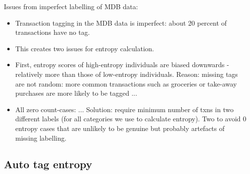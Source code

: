Issues from imperfect labelling of MDB data:
\begin{itemize}

    \item Transaction tagging in the MDB data is imperfect: about 20 percent of
        transactions have no tag.

    \item This creates two issues for entropy calculation.

    \item First, entropy scores of high-entropy individuals are biased
        downwards - relatively more than those of low-entropy individuals.
        Reason: missing tags are not random: more common transactions such as
        groceries or take-away purchases are more likely to be tagged ...

    \item All zero count-cases: ... Solution: require minimum number of txns in
        two different labels (for all categories we use to calculate entropy).
        Two to avoid 0 entropy cases that are unlikely to be genuine but
        probably artefacts of missing labelling.
        
\end{itemize}



\subsection{Auto tag entropy}
\label{par:auto_tag_entropy}

